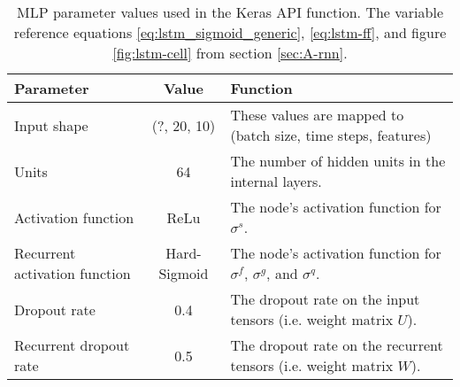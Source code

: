 \begin{table}[ht!]
    \centering
    \caption{\ac{MLP} parameter values used in the Keras API function. The variable reference equations \ref{eq:lstm_sigmoid_generic}, \ref{eq:lstm-ff}, and figure \ref{fig:lstm-cell} from section \ref{sec:A-rnn}.}
    \begin{tabular}{>{\raggedright}p{} | c | p{}}
        Parameter                       & Value         & Function \\ \hline
        Input shape                     & (?, 20, 10)   & These values are mapped to (batch size, time steps, features) \\ \hline
        Units                           & 64            & The number of hidden units in the internal layers. \\ \hline
        Activation function             & ReLu          & The node's activation function for $\sigma^s$.\\ \hline
        Recurrent activation function   & Hard-Sigmoid  & The node's activation function for $\sigma^f$, $\sigma^g$, and $\sigma^q$.\\ \hline
        Dropout rate                    & 0.4           & The dropout rate on the input tensors (i.e. weight matrix $U$). \\ \hline
        Recurrent dropout rate          & 0.5           & The dropout rate on the recurrent tensors (i.e. weight matrix $W$). \\ \hline
    \end{tabular}
    \label{tab:lstm-parameters}
\end{table}